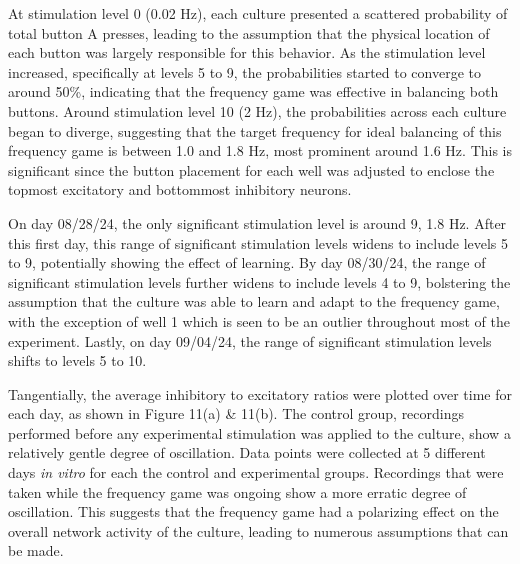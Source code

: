 \documentclass{article} %
\begin{document}
At stimulation level 0 (0.02 Hz), each culture presented a scattered probability of total button A presses, leading to the assumption that the physical location of each button was largely responsible for this behavior. As the stimulation level increased, specifically at levels 5 to 9, the probabilities started to converge to around 50\%, indicating that the frequency game was effective in balancing both buttons. Around stimulation level 10 (2 Hz), the probabilities across each culture began to diverge, suggesting that the target frequency for ideal balancing of this frequency game is between 1.0 and 1.8 Hz, most prominent around 1.6 Hz. This is significant since the button placement for each well was adjusted to enclose the topmost excitatory and bottommost inhibitory neurons.

On day 08/28/24, the only significant stimulation level is around 9, 1.8 Hz. After this first day, this range of significant stimulation levels widens to include levels 5 to 9, potentially showing the effect of learning. By day 08/30/24, the range of significant stimulation levels further widens to include levels 4 to 9, bolstering the assumption that the culture was able to learn and adapt to the frequency game, with the exception of well 1 which is seen to be an outlier throughout most of the experiment. Lastly, on day 09/04/24, the range of significant stimulation levels shifts to levels 5 to 10. 

Tangentially, the average inhibitory to excitatory ratios were plotted over time for each day, as shown in Figure 11(a) \& 11(b). The control group, recordings performed before any experimental stimulation was applied to the culture, show a relatively gentle degree of oscillation. Data points were collected at 5 different days \textit{in vitro} for each the control and experimental groups. Recordings that were taken while the frequency game was ongoing show a more erratic degree of oscillation. This suggests that the frequency game had a polarizing effect on the overall network activity of the culture, leading to numerous assumptions that can be made.
\end{document}
